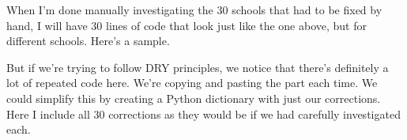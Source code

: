 \documentclass[letterpaper,10pt,english]{sphinxmanual}
\begin{document}
When I’m done manually investigating the 30 schools that had to be fixed by hand, I will have 30 lines of code that look just like the one above, but for different schools.  Here’s a sample.

\begin{sphinxVerbatim}[commandchars=\\\{\}]
\PYG{p}{[}\PYG{p}{]}  
\PYG{p}{[}\PYG{p}{]}  
\PYG{p}{[}\PYG{p}{]}  
\PYG{p}{[}\PYG{p}{]}  
\end{sphinxVerbatim}

But if we’re trying to follow DRY principles, we notice that there’s definitely a lot of repeated code here.  We’re copying and pasting the  part each time.  We could simplify this by creating a Python dictionary with just our corrections.  Here I include all 30 corrections as they would be if we had carefully investigated each.
\end{document}
